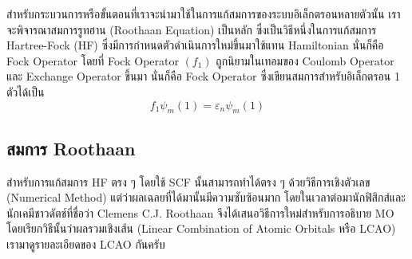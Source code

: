 สำหรับกระบวนการหรือขั้นตอนที่เราจะนำมาใช้ในการแก้สมการของระบบอิเล็กตรอนหลายตัวนั้น เราจะพิจารณาสมการรูทฮาน (Roothaan Equation) เป็นหลัก ซึ่งเป็นวิธีหนึ่งในการแก้สมการ Hartree-Fock (HF) ซึ่งมีการกำหนดตัวดำเนินการใหม่ขึ้นมาใช้แทน Hamiltonian นั่นก็คือ Fock Operator โดยที่ Fock Operator $(f_{1})$ ถูกนิยามในเทอมของ Coulomb Operator และ Exchange Operator ขึ้นมา นั่นก็คือ Fock Operator ซึ่งเขียนสมการสำหรับอิเล็กตรอน 1 ตัวได้เป็น
%
\begin{equation}\label{eq:fock}
    f_{1} \psi_{m}(1) = \varepsilon_{n} \psi_{m}(1)
\end{equation}

\subsection{สมการ Roothaan}
\label{ssec:roothaan}

สำหรับการแก้สมการ HF ตรง ๆ โดยใช้ SCF นั้นสามารถทำได้ตรง ๆ ด้วยวิธีการเชิงตัวเลข (Numerical Method) แต่ว่าผลเฉลยที่ได้มานั้นมีความซับซ้อนมาก โดยในเวลาต่อมานักฟิสิกส์และนักเคมีชาวดัตช์ที่ชื่อว่า Clemens C.J. Roothaan จึงได้เสนอวิธีการใหม่สำหรับการอธิบาย MO โดยเรียกวิธีนั้นว่าผลรวมเชิงเส้น (Linear Combination of Atomic Orbitals หรือ LCAO)\autocite{atkins2010} เรามาดูรายละเอียดของ LCAO กันครับ

